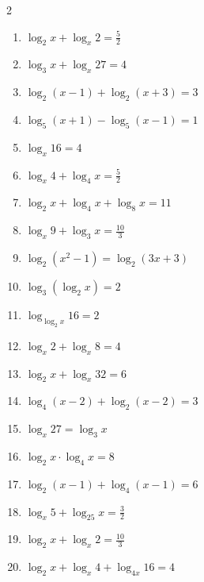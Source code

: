 \documentclass[12pt,a4paper]{article}
\begin{document}
\begin{multicols}{2}
\begin{enumerate}[leftmargin=*, itemsep=6pt]

\item \(\log_2 x+\log_x 2=\frac52\)

\item \(\log_3 x+\log_x 27=4\)

\item \(\log_2(x-1)+\log_2(x+3)=3\)

\item \(\log_5(x+1)-\log_5(x-1)=1\)

\item \(\log_x16=4\)

\item \(\log_x4+\log_4x=\frac52\)

\item \(\log_2x+\log_4x+\log_8x=11\)

\item \(\log_x9+\log_3x=\frac{10}{3}\)

\item \(\log_2(x^2-1)=\log_2(3x+3)\)

\item \(\log_3(\log_2 x)=2\)

\item \(\log_{\log_2 x}16=2\)

\item \(\log_x2+\log_x8=4\)

\item \(\log_2x+\log_x32=6\)

\item \(\log_4(x-2)+\log_2(x-2)=3\)

\item \(\log_x27=\log_3x\)

\item \(\log_2x\cdot\log_4x=8\)

\item \(\log_2(x-1)+\log_4(x-1)=6\)

\item \(\log_x5+\log_{25}x=\frac32\)

\item \(\log_2x+\log_x2=\frac{10}{3}\)

\item \(\log_2x+\log_x4+\log_{4x}16=4\)

\end{enumerate}
\end{multicols}
\newpage
\end{document}
